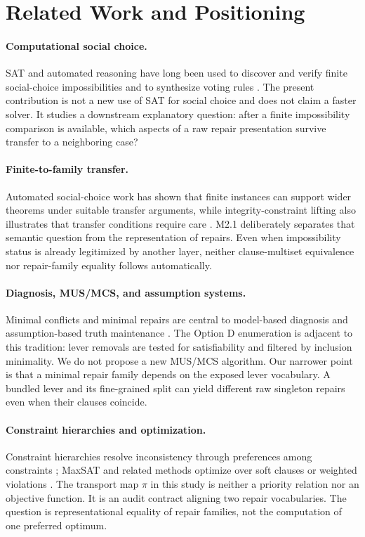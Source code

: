 \section{Related Work and Positioning}\label{sec:related}

\paragraph{Computational social choice.}
SAT and automated reasoning have long been used to discover and verify finite
social-choice impossibilities and to synthesize voting rules
\citep{tanglin2009computer,geist2011automated,brandtgeist2016strategyproof}.
The present contribution is not a new use of SAT for social choice and does not
claim a faster solver.  It studies a downstream explanatory question: after a
finite impossibility comparison is available, which aspects of a raw repair
presentation survive transfer to a neighboring case?

\paragraph{Finite-to-family transfer.}
Automated social-choice work has shown that finite instances can support wider
theorems under suitable transfer arguments, while integrity-constraint lifting
also illustrates that transfer conditions require care
\citep{geist2011automated,grandiendriss2013}.  M2.1 deliberately separates that
semantic question from the representation of repairs.  Even when impossibility
status is already legitimized by another layer, neither clause-multiset
equivalence nor repair-family equality follows automatically.

\paragraph{Diagnosis, MUS/MCS, and assumption systems.}
Minimal conflicts and minimal repairs are central to model-based diagnosis and
assumption-based truth maintenance \citep{dekleer1986atms,reiter1987}.
The Option D enumeration is adjacent to this tradition: lever removals are
tested for satisfiability and filtered by inclusion minimality.  We do not
propose a new MUS/MCS algorithm.  Our narrower point is that a minimal repair
family depends on the exposed lever vocabulary.  A bundled lever and its
fine-grained split can yield different raw singleton repairs even when their
clauses coincide.

\paragraph{Constraint hierarchies and optimization.}
Constraint hierarchies resolve inconsistency through preferences among
constraints \citep{borning1992constraint}; MaxSAT and related methods optimize
over soft clauses or weighted violations \citep{li2009maxsat}.  The transport
map $\pi$ in this study is neither a priority relation nor an objective
function.  It is an audit contract aligning two repair vocabularies.  The
question is representational equality of repair families, not the computation
of one preferred optimum.

